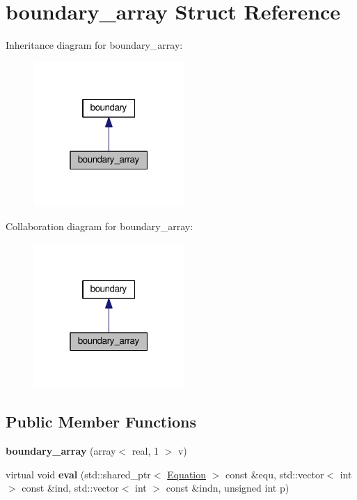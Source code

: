 \hypertarget{structboundary__array}{\section{boundary\+\_\+array Struct Reference}
\label{structboundary__array}
}


Inheritance diagram for boundary\+\_\+array\+:\nopagebreak
\begin{figure}[H]
\begin{center}
\leavevmode
\includegraphics[width=163pt]{structboundary__array__inherit__graph}
\end{center}
\end{figure}


Collaboration diagram for boundary\+\_\+array\+:\nopagebreak
\begin{figure}[H]
\begin{center}
\leavevmode
\includegraphics[width=163pt]{structboundary__array__coll__graph}
\end{center}
\end{figure}
\subsection*{Public Member Functions}
\begin{DoxyCompactItemize}
\item 
\hypertarget{structboundary__array_aa09696734c5db0908a66c59599751585}{{\bfseries boundary\+\_\+array} (array$<$ real, 1 $>$ v)}\label{structboundary__array_aa09696734c5db0908a66c59599751585}

\item 
\hypertarget{structboundary__array_ade5479ae68a0b88e4b16d572e671e436}{virtual void {\bfseries eval} (std\+::shared\+\_\+ptr$<$ \hyperlink{classEquation}{Equation} $>$ const \&equ, std\+::vector$<$ int $>$ const \&ind, std\+::vector$<$ int $>$ const \&indn, unsigned int p)}\label{structboundary__array_ade5479ae68a0b88e4b16d572e671e436}

\end{DoxyCompactItemize}
